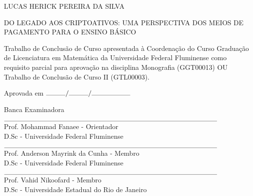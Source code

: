 

\begin{center}
	
	LUCAS HERICK PEREIRA DA SILVA	
	
	\vspace{1cm}
	
\uppercase{Do legado aos criptoativos: uma perspectiva dos meios de pagamento para o ensino básico} 
	\vspace{1.0cm}
	
	\begin{flushright}
		\begin{minipage}{7.75 cm}
			\nohyphens{
			Trabalho de Conclusão de Curso apresentada à Coordenação do Curso Graduação de Licenciatura em Matemática da Universidade Federal Fluminense como requisito parcial para aprovação na disciplina Monografia (GGT00013) OU Trabalho de Conclusão de Curso II (GTL00003).
		}
			
		\end{minipage}
	\end{flushright}

\vspace{1cm}

\begin{flushleft}
	Aprovada em $\rule{1cm}{0.1mm}\slash\rule{1cm}{0.1mm}\slash\rule{2cm}{0.1mm}$
\end{flushleft}	

\vspace{1cm}

Banca Examinadora 

\vspace{1.5cm}

\begin{flushleft}
		$\rule{11cm}{0.1mm}$\\
	Prof. Mohammad Fanaee - Orientador\\
	D.Sc - Universidade Federal Fluminense\\
	
	\vspace{1cm}
	
		$\rule{11cm}{0.1mm}$\\
	Prof. Anderson Mayrink da Cunha - Membro\\
	D.Sc - Universidade Federal Fluminense\\
	
	\vspace{1cm}
	
		$\rule{11cm}{0.1mm}$\\
	Prof. Vahid Nikoofard - Membro\\
	D.Sc - Universidade Estadual do Rio de Janeiro\\
\end{flushleft}
	
	
	\vfill
	
\end{center}
